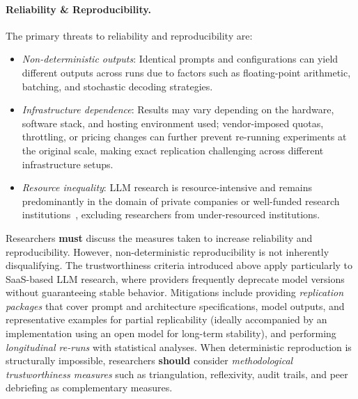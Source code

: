 \documentclass[smallextended]{svjour3}
\newcommand{\must}{\textbf{must}\xspace}
\newcommand{\should}{\textbf{should}\xspace}
\newcommand{\guidelineparagraph}[1]{\paragraph{#1.}}
\newcommand{\guidelineparagraph}[1]{\paragraph{#1}}
\begin{document}
\guidelineparagraph{Reliability \& Reproducibility}
The primary threats to reliability and reproducibility are:
\begin{itemize}
    \item \emph{Non-deterministic outputs}: Identical prompts and configurations can yield different outputs across runs due to factors such as floating-point arithmetic, batching, and stochastic decoding strategies.
    \item \emph{Infrastructure dependence}: Results may vary depending on the hardware, software stack, and hosting environment used; vendor-imposed quotas, throttling, or pricing changes can further prevent re-running experiments at the original scale, making exact replication challenging across different infrastructure setups.
    \item \emph{Resource inequality}: LLM research is resource-intensive and remains predominantly in the domain of private companies or well-funded research institutions~\cite{schwartz2020green, ahmed2023industry}, excluding researchers from under-resourced institutions.
\end{itemize}

Researchers \must discuss the measures taken to increase reliability and reproducibility.
However, non-deterministic reproducibility is not inherently disqualifying. The trustworthiness criteria introduced above apply particularly to SaaS-based LLM research, where providers frequently deprecate model versions without guaranteeing stable behavior.
Mitigations include providing \emph{replication packages} that cover prompt and architecture specifications, model outputs, and representative examples for partial replicability (ideally accompanied by an implementation using an open model for long-term stability), and performing \emph{longitudinal re-runs} with statistical analyses. When deterministic reproduction is structurally impossible, researchers \should consider \emph{methodological trustworthiness measures} such as triangulation, reflexivity, audit trails, and peer debriefing as complementary measures.
\end{document}
